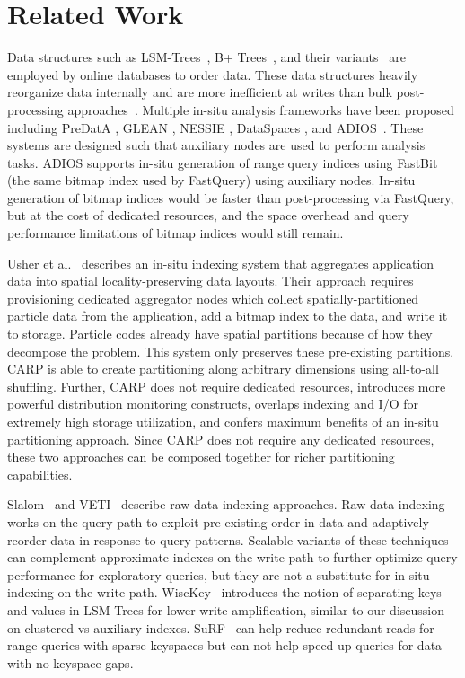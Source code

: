 \section{Related Work}
\label{sec:carp:rel_work}

Data structures such as LSM-Trees~\cite{ONeil1996}, B+ Trees~\cite{Comer1979:UbiquitousBTree}, and
their variants~\cite{Raju2017} are employed by online databases to order
data.
These data structures heavily reorganize data internally and are more inefficient at writes than
bulk post-processing approaches~\cite{Qiao2022:ClosingTreeVs}.
Multiple in-situ analysis frameworks have been proposed including PreDatA \cite{Zheng2010:PreDatA},
GLEAN \cite{Vishw2011:SimulationtimeDataAnalysis, Vishw2011:GLEAN}, NESSIE \cite{Oldfi2012:Nessie},
DataSpaces \cite{Docan2010:DataSpaces}, and ADIOS~\cite{Gu2018:QueryingLargeScientifica}.
These systems are designed such that auxiliary nodes are used to perform analysis tasks.
ADIOS supports in-situ generation of range query indices using FastBit~\cite{Wu2005:FastBit} (the
same bitmap index used by FastQuery) using auxiliary nodes.
In-situ generation of bitmap indices would be faster than post-processing via FastQuery, but at the
cost of dedicated resources, and the space overhead and query performance limitations of bitmap
indices would still remain.

Usher et al.~\cite{Usher2021:AdaptiveSpatiallyAware} describes an in-situ indexing system that
aggregates application data into spatial locality-preserving data layouts.
Their approach requires provisioning dedicated aggregator nodes which collect spatially-partitioned
particle data from the application, add a bitmap index to the data, and write it to storage.
Particle codes already have spatial partitions because of how they decompose the problem.
This system only preserves these pre-existing partitions.
CARP is able to create partitioning along arbitrary dimensions using all-to-all shuffling.
Further, CARP does not require dedicated resources, introduces more powerful distribution
monitoring constructs, overlaps indexing and I/O for extremely high storage utilization, and
confers maximum benefits of an in-situ partitioning approach.
Since CARP does not require any dedicated resources, these two approaches can be composed together
for richer partitioning capabilities.

Slalom~\cite{Olma2017:Slalom} and VETI~\cite{Marou2023:VETI} describe raw-data indexing approaches.
Raw data indexing works on the query path to exploit pre-existing order in data and adaptively
reorder data in response to query patterns.
Scalable variants of these techniques can complement approximate indexes on the write-path to
further optimize query performance for exploratory queries, but they are not a substitute for
in-situ indexing on the write path.
WiscKey~\cite{Lu2017:WiscKey} introduces the notion of separating keys and values in LSM-Trees for
lower write amplification, similar to our discussion on clustered vs auxiliary indexes.
SuRF~\cite{Zhang2018:SuRF} can help reduce redundant reads for range queries with sparse keyspaces
but can not help speed up queries for data with no keyspace gaps.

